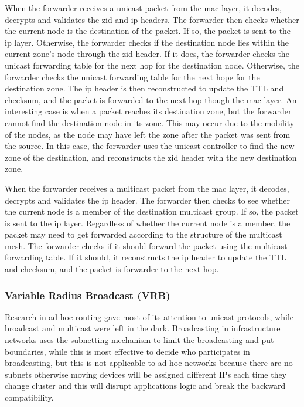 When the forwarder receives a unicast packet from the \acrshort{mac} layer, it decodes, decrypts and validates the \acrshort{zid} and \acrshort{ip} headers. The forwarder then checks whether the current node is the destination of the packet. If so, the packet is sent to the \acrshort{ip} layer. Otherwise, the forwarder checks if the destination node lies within the current zone's node through the \acrshort{zid} header. If it does, the forwarder checks the unicast forwarding table for the next hop for the destination node. Otherwise, the forwarder checks the unicast forwarding table for the next hope for the destination zone. The \acrshort{ip} header is then reconstructed to update the TTL and checksum, and the packet is forwarded to the next hop though the \acrshort{mac} layer. An interesting case is when a packet reaches its destination zone, but the forwarder cannot find the destination node in its zone. This may occur due to the mobility of the nodes, as the node may have left the zone after the packet was sent from the source. In this case, the forwarder uses the unicast controller to find the new zone of the destination, and reconstructs the \acrshort{zid} header with the new destination zone.

When the forwarder receives a multicast packet from the \acrshort{mac} layer, it decodes, decrypts and validates the \acrshort{ip} header. The forwarder then checks to see whether the current node is a member of the destination multicast group. If so, the packet is sent to the \acrshort{ip} layer. Regardless of whether the current node is a member, the packet may need to get forwarded according to the structure of the multicast mesh. The forwarder checks if it should forward the packet using the multicast forwarding table. If it should, it reconstructs the \acrshort{ip} header to update the TTL and checksum, and the packet is forwarder to the next hop.

\subsubsection{Variable Radius Broadcast (VRB)}
Research in ad-hoc routing gave most of its attention to unicast protocols, while broadcast and multicast were left in the dark.
Broadcasting in infrastructure networks uses the subnetting mechanism to limit the broadcasting and put boundaries, while this is most effective to decide who participates in broadcasting, but this is not applicable to ad-hoc networks because there are no subnets otherwise moving devices will be assigned different IPs each time they change cluster and this will disrupt applications logic and break the backward compatibility.


